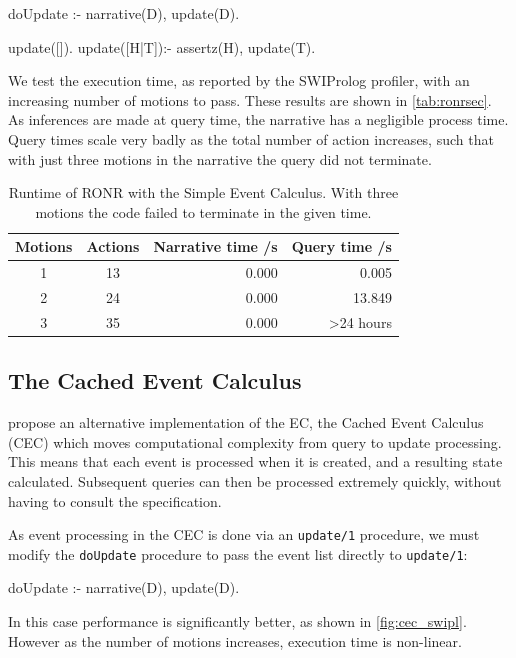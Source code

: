 \begin{prologinline}
doUpdate :-
	narrative(D),
	update(D).

update([]).
update([H|T]):-
	assertz(H),
	update(T).
\end{prologinline}

We test the execution time, as reported by the SWIProlog profiler, with
an increasing number of motions to pass. These results are shown in \autoref{tab:ronrsec}.
As inferences are made at query time, the narrative has a negligible process
time. Query times scale very badly as the total number of action increases, such
that with just three motions in the narrative the query did not terminate.

\begin{table}
\caption[Runtime of RONR with the Simple Event Calculus]{Runtime of RONR with the Simple Event Calculus. With three motions the
code failed to terminate in the given time.}\label{tab:ronrsec}
\centering
\begin{tabular}{c|c|r|r}
Motions & Actions & Narrative time /s & Query time /s \\ \hline
1 & 13 & 0.000 & 0.005 \\
2 & 24 & 0.000 & 13.849 \\
3 & 35 & 0.000 & >24 hours \\
\end{tabular}
\end{table}

\subsection{The Cached Event Calculus}

\citet{Chittaro1996} propose an alternative implementation of the \ac{EC}, the
Cached Event Calculus (CEC) which
moves computational complexity from query to update processing. This means that
each event is processed when it is created, and a resulting state calculated.
Subsequent queries can then be processed extremely quickly, without having to
consult the specification.

As event processing in the CEC is done via an \texttt{update/1} procedure, we
must modify the \texttt{doUpdate} procedure to pass the event list directly to
\texttt{update/1}:

\begin{prologinline}
doUpdate :-
	narrative(D),
	update(D).
\end{prologinline}

In this case performance is significantly better, as shown in
\autoref{fig:cec_swipl}. However as the number of motions increases, execution
time is non-linear.

